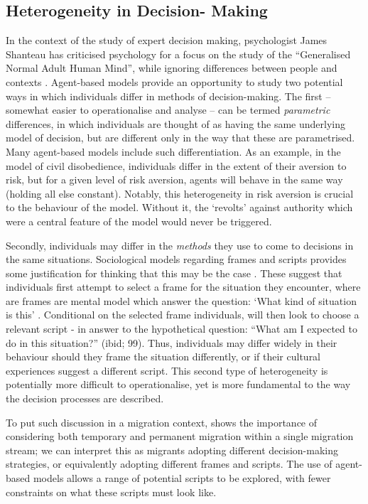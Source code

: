 \documentclass{article}
\begin{document}
\subsection{Heterogeneity in Decision-
Making}\label{heterogeneity-in-decision-strategies}

In the context of the study of expert decision making, psychologist James Shanteau has criticised psychology for a focus on the study of the ``Generalised Normal Adult Human Mind'', while ignoring differences between people and contexts \citep{Shanteau2015}. Agent-based models provide an opportunity to study two potential ways in which individuals differ in methods of decision-making. The first -- somewhat easier to operationalise and analyse -- can be termed \emph{parametric} differences, in which individuals are thought of as having the same underlying model of decision, but are different only in the way that these are parametrised. Many agent-based models include such differentiation. As an example, in the \citet{Epstein2002} model of civil disobedience, individuals differ in the extent of their aversion to risk, but for a given level of risk aversion, agents will behave in the same way (holding all else constant). Notably, this heterogeneity in risk aversion is crucial to the behaviour of the model. Without it, the `revolts' against authority which were a central feature of the model would never be triggered.

Secondly, individuals may differ in the \emph{methods} they use to come to decisions in the same situations. Sociological models regarding frames and scripts provides some justification for thinking that this may be the case \citep{Kronenberg2014}. These suggest that individuals first attempt to select a frame for the situation they encounter, where are frames are mental model which answer the question: `What kind of situation is this' . Conditional on the selected frame individuals, will then look to choose a relevant script - in answer to the hypothetical question: ``What am I expected to do in this situation?'' (ibid; 99). Thus, individuals may differ widely in their behaviour should they frame the situation differently, or if their cultural experiences suggest a different script.  This second type of heterogeneity is potentially more difficult to operationalise, yet is more fundamental to the way the decision processes are described.

To put such discussion in a migration context, \cite{Bijwaard2008} shows the importance of considering both temporary and permanent migration within a single migration stream; we can interpret this as migrants adopting different decision-making strategies, or equivalently adopting different frames and scripts. The use of agent-based models allows a range of potential scripts to be explored, with fewer constraints on what these scripts must look like. 
\end{document}
